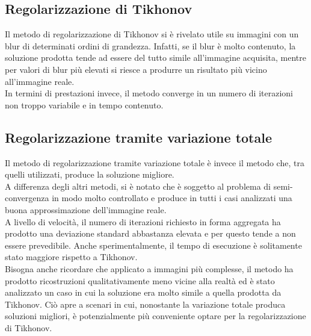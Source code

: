 \documentclass[11pt]{article}
\begin{document}
\subsection{Regolarizzazione di Tikhonov}
Il metodo di regolarizzazione di Tikhonov si è rivelato utile su immagini con un blur di determinati ordini di grandezza. 
Infatti, se il blur è molto contenuto, la soluzione prodotta tende ad essere del tutto simile all'immagine acquisita, mentre per valori di blur più elevati si riesce a produrre un risultato più vicino all'immagine reale.\\
In termini di prestazioni invece, il metodo converge in un numero di iterazioni non troppo variabile e in tempo contenuto.

\subsection{Regolarizzazione tramite variazione totale}
Il metodo di regolarizzazione tramite variazione totale è invece il metodo che, tra quelli utilizzati, produce la soluzione migliore.\\
A differenza degli altri metodi, si è notato che è soggetto al problema di semi-convergenza in modo molto controllato e produce in tutti i casi analizzati una buona approssimazione dell'immagine reale.\\
A livello di velocità, il numero di iterazioni richiesto in forma aggregata ha prodotto una deviazione standard abbastanza elevata e per questo tende a non essere prevedibile. 
Anche sperimentalmente, il tempo di esecuzione è solitamente stato maggiore rispetto a Tikhonov.\\
Bisogna anche ricordare che applicato a immagini più complesse, il metodo ha prodotto ricostruzioni qualitativamente meno vicine alla realtà ed è stato analizzato un caso in cui la soluzione era molto simile a quella prodotta da Tikhonov. Ciò apre a scenari in cui, nonostante la variazione totale produca soluzioni migliori, è potenzialmente più conveniente optare per la regolarizzazione di Tikhonov.




\newpage
\printbibliography[title={Bibliografia}]
\end{document}

